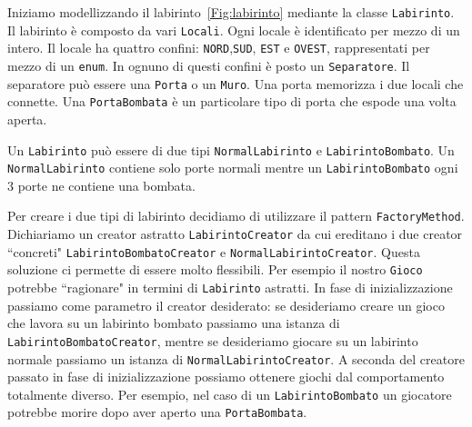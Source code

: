 \documentclass{article}
\begin{document}
Iniziamo modellizzando il labirinto~\ref{Fig:labirinto} mediante la classe \texttt{Labirinto}. Il labirinto \`e composto da vari \texttt{Locali}. Ogni locale \`e identificato per mezzo di un intero. Il locale ha quattro confini: \texttt{NORD},\texttt{SUD}, \texttt{EST} e \texttt{OVEST}, rappresentati per mezzo di un \texttt{enum}. In ognuno di questi confini \`e posto un \texttt{Separatore}. Il separatore pu\`o essere una \texttt{Porta} o un \texttt{Muro}. Una porta memorizza i due locali che connette. Una \texttt{PortaBombata} \`e un particolare tipo di porta che espode una volta aperta. 

Un \texttt{Labirinto} pu\`o essere di due tipi \texttt{NormalLabirinto} e \texttt{LabirintoBombato}. Un \texttt{NormalLabirinto} contiene solo porte normali mentre un \texttt{LabirintoBombato} ogni 3 porte ne contiene una bombata. 

Per creare i due tipi di labirinto decidiamo di utilizzare il pattern \texttt{FactoryMethod}. Dichiariamo un creator astratto \texttt{LabirintoCreator} da cui ereditano i due creator ``concreti" \texttt{LabirintoBombatoCreator} e \texttt{NormalLabirintoCreator}. Questa soluzione ci permette di essere molto flessibili. Per esempio il nostro \texttt{Gioco} potrebbe ``ragionare" in termini di \texttt{Labirinto} astratti. In fase di inizializzazione passiamo come parametro il creator desiderato: se desideriamo creare un gioco che lavora su un labirinto bombato passiamo una istanza di \texttt{LabirintoBombatoCreator}, mentre se desideriamo giocare su un labirinto normale passiamo un istanza di \texttt{NormalLabirintoCreator}.
A seconda del creatore passato in fase di inizializzazione possiamo ottenere giochi dal comportamento totalmente diverso. Per esempio, nel caso di un \texttt{LabirintoBombato} un giocatore potrebbe morire dopo aver aperto una \texttt{PortaBombata}.
\end{document}
